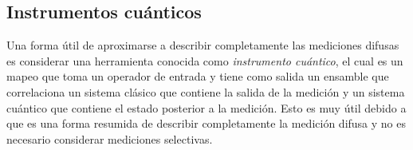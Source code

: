 \begin{comment} \subsection{Otra aproximación} %
    Ahora, considerando una medida proyectiva, supóngase que el observable es no degenerado y la salida de la medición sobre el estado inicial $\rho $ fue el valor propio $a_j b_k$ con $j,k=0,1$ y el operador de proyección será $P_{a_j,b_k}$. Luego, el estado después de la medición será \begin{equation}
       \begin{split}
           \rho'&= p\dfrac{ P_{a_j,b_k}\rho P_{a_j,b_k}}{\tr(\rho P_{a_j,b_k})}+ (1-p)\dfrac{S P_{a_j,b_k}\rho P_{a_j,b_k}S^\dagger}{\tr(\rho P_{a_j,b_k} S^\dagger SP_{a_j,b_k})}\\
           &=\dfrac{p P_{a_j,b_k}\rho P_{a_j,b_k}+(1-p) S P_{a_j,b_k}\rho P_{a_j,b_k}S^\dagger}{\tr(\rho P_{a_j,b_k})},
       \end{split}
    \end{equation} donde $S$ es el operador SWAP\@. En consecuencia, los operadores de Kraus que describen el efecto de la medición para una medida selectiva serán $\{\sqrt{p}P_{a_j,b_k}, (\sqrt{1-p})S P_{a_j,b_k}\}$, con $j,k=0,1$. Este mapeo contempla la forma de la operaciones cuánticas normalizadas $\E(\rho)/\tr(\E(\rho))$. Para esta aproximación se realizó un  programa que mapea un operador de estado inicial a un estado final después de una medición difusa, que se describe con esta aproximación con la que se pueden obtener varios ejemplos. El programa se puede obtener en el repositorio \href{https://github.com/Mohs9/Practicas_Tesis/blob/d751cf4a3b187f124057c927433b29aa6d918ef1/InformeFinal/Code/FuzzyMeasure.nb}{\textit{al presionar este texto.}}
\end{comment}
    




\subsection{Instrumentos cuánticos}\label{sec:instrumentos-cuanticos} %

Una forma útil de aproximarse a describir completamente las mediciones difusas
es considerar una herramienta conocida como \textit{instrumento cuántico}, el
cual es un mapeo que toma un operador de entrada y tiene como salida un
ensamble que correlaciona un sistema clásico que contiene la salida de la
medición y un sistema cuántico que contiene el estado posterior a la medición. Esto es muy útil debido a que es una forma resumida
de describir completamente la medición difusa y no es necesario considerar
mediciones selectivas. 


